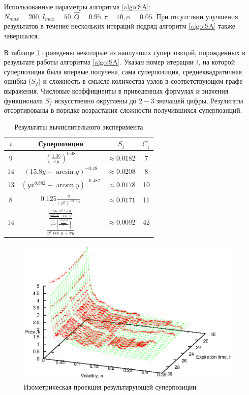 \documentclass[12pt,a4paper]{article}
\begin{document}
Использованные параметры алгоритма \ref{algo:SA}: $N_{max} = 200, I_{max} = 50,
\hat{Q} = 0.95, \tau = 10, \alpha = 0.05$. При отсутствии улучшения результатов
в течение нескольких итераций подряд алгоритм \ref{algo:SA} также завершался.

В таблице \ref{tabl:results} приведены некоторые из наилучших суперпозиций,
порожденных в результате работы алгоритма \ref{algo:SA}. Указан номер
итерации $i$, на которой суперпозиция была впервые получена, сама суперпозиция,
среднеквадратичная ошибка ($S_f$) и сложность в смысле количества узлов в
соответствующем графе выражения. Числовые коэффициенты в приведенных формулах
и значения функционала $S_f$ искусственно округлены до $2-3$ значащей цифры.
Результаты отсортированы в порядке возрастания сложности получившихся
суперпозиций.

\begin{table}[h]
  \begin{tabular}{| c | c | c | c |} \hline
	$i$ & Суперпозиция													& $S_f$				& $C_f$ \\ \hline
	9	& $\displaystyle \left(\frac{1.36}{xy}\right)^{0.48}$			& $\approx 0.0182$	& 7		\\ \hline
	14	& $\displaystyle (15.8y + \arcsin y)^{-0.48}$					& $\approx 0.0208$	& 8		\\ \hline
	13	& $\displaystyle (yx^{0.882} + \arcsin y)^{-0.482}$				& $\approx 0.0178$	& 10	\\ \hline
	8	& $\displaystyle 0.125 \frac{y}{(y^2)^{0.8+y}}$					& $\approx 0.0171$	& 11	\\ \hline
	14	& $\displaystyle \frac{\frac{3.86 \cdot 10^{11} + y}{\frac{y\frac{1.227 \cdot 10^{11}}{x^y}-2.46 \cdot 10^{8}}{y \cos \left(\frac{\frac{-5.89 \cdot 10^{-3}+y}{\frac{y - 5.47 \cdot 10^{-3}}{y \cos y}}}{y}\right)}}}{y^y \cos y + xy}$	& $\approx 0.0092$	& 42		\\ \hline
  \end{tabular}
  \caption{Результаты вычислительного эксперимента}
  \label{tabl:results}
\end{table}

\begin{figure}[h]
  \includegraphics[scale=1.1]{figs/1-iso.eps}
  \caption{Изометрическая проекция результирующей суперпозиции}
  \label{fig:1_iso}
\end{figure}
\end{document}
